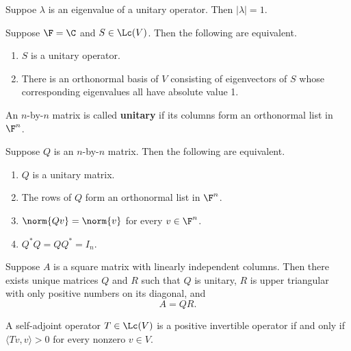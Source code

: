 \documentclass{extarticle}
\begin{document}
\begin{corollary}
    Suppoe \(\lambda\) is an eigenvalue of a unitary operator. Then
    \(|\lambda| = 1\).
\end{corollary}

\begin{corollary}
    Suppose \(\F = \C\) and \(S \in \Lc(V)\). Then the following are equivalent.
    \begin{enumerate}[label=(\alph*)]
        \item \(S\) is a unitary operator.
        \item There is an orthonormal basis of \(V\) consisting of eigenvectors of \(S\) whose
        corresponding eigenvalues all have absolute value 1.
    \end{enumerate}
\end{corollary}

\begin{definition}
    An \(n\)-by-\(n\) matrix is called \textbf{unitary} if its columns form an orthonormal list in \(\F^n\).
\end{definition}

\begin{thm}
    Suppose \(Q\) is an \(n\)-by-\(n\) matrix. Then the following are equivalent.
    \begin{enumerate}[label=(\alph*)]
        \item \(Q\) is a unitary matrix.
        \item The rows of \(Q\) form an orthonormal list in \(\F^n\).
        \item \(\norm{Qv} = \norm{v}\) for every \(v \in \F^n\).
        \item \(Q^* Q = Q Q^* = I_n\).
    \end{enumerate}
\end{thm}

\begin{thm}[QR factorization]
    Suppose \(A\) is a square matrix with linearly independent columns. Then there exists
    unique matrices \(Q\) and \(R\) such that \(Q\) is unitary, \(R\) is upper triangular
    with only positive numbers on its diagonal, and
    \[A = QR.\]
\end{thm}

\begin{lemma}
    A self-adjoint operator \(T \in \Lc(V)\) is a positive invertible operator if and only
    if \(\langle Tv,v \rangle > 0\) for every nonzero \(v \in V\).
\end{lemma}
\end{document}
